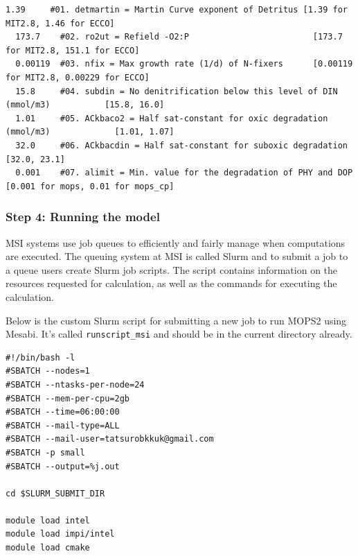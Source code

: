 \documentclass[a4paper]{article}
\def\noin{\noindent }
\begin{document}
\begin{enumerate}
\lstset{language=sh} 
\begin{lstlisting}[frame=single,basicstyle=\scriptsize,commentstyle=\color{blue}]
  1.39     #01. detmartin = Martin Curve exponent of Detritus [1.39 for MIT2.8, 1.46 for ECCO]
  173.7    #02. ro2ut = Refield -O2:P                         [173.7 for MIT2.8, 151.1 for ECCO]
  0.00119  #03. nfix = Max growth rate (1/d) of N-fixers      [0.00119 for MIT2.8, 0.00229 for ECCO]
  15.8     #04. subdin = No denitrification below this level of DIN (mmol/m3)           [15.8, 16.0]
  1.01     #05. ACkbaco2 = Half sat-constant for oxic degradation (mmol/m3)             [1.01, 1.07]
  32.0     #06. ACkbacdin = Half sat-constant for suboxic degradation                   [32.0, 23.1]
  0.001    #07. alimit = Min. value for the degradation of PHY and DOP [0.001 for mops, 0.01 for mops_cp]
\end{lstlisting}

\end{enumerate}

\subsubsection{Step 4: Running the model}
\noin MSI systems use job queues to efficiently and fairly manage when computations are executed. The queuing system at MSI is called Slurm and to submit a job to a queue users create Slurm job scripts. The script contains information on the resources requested for calculation, as well as the commands for executing the calculation. 

Below is the custom Slurm script for submitting a new job to run MOPS2 using Mesabi. It's called \verb|runscript_msi| and should be in the current directory already.

\lstset{language=sh} 
\begin{lstlisting}[frame=single,basicstyle=\scriptsize]
#!/bin/bash -l        
#SBATCH --nodes=1
#SBATCH --ntasks-per-node=24
#SBATCH --mem-per-cpu=2gb
#SBATCH --time=06:00:00
#SBATCH --mail-type=ALL  
#SBATCH --mail-user=tatsurobkkuk@gmail.com
#SBATCH -p small
#SBATCH --output=%j.out

cd $SLURM_SUBMIT_DIR

module load intel
module load impi/intel
module load cmake
\end{lstlisting}
\end{document}
